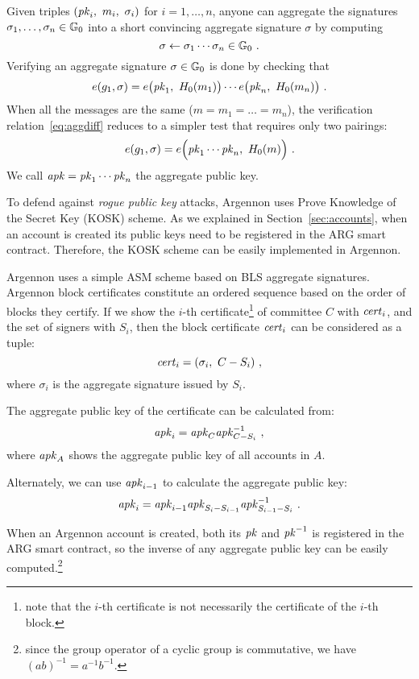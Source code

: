 Given triples $(\PK_i,\ m_i,\ \sigma_i)$ for $i=1,\ldots,n$,
anyone can aggregate the signatures $\sigma_1,\ldots,\sigma_n \in \mathbb{G}_0$
into a short convincing aggregate signature $\sigma$ by computing
\begin{equation}
    \label{eq:agg}
    \sigma \gets \sigma_1 \cdots \sigma_n \in \mathbb{G}_0\ .
\end{equation}
Verifying an aggregate signature $\sigma \in \mathbb{G}_0$ is done by checking that
\begin{equation}
    \label{eq:aggdiff}
    e(g_1, \sigma) = e\big(\PK_1,\ \Hm(m_1)\big) \cdots e\big(\PK_n,\ \Hm(m_n)\big)\ .
\end{equation}
When all the messages are the same ($m = m_1 = \ldots = m_n$), the verification relation~\eqref{eq:aggdiff} reduces to
a simpler test that requires only two pairings:
\begin{equation}
    \label{eq:aggsame}
    e(g_1, \sigma) = e\Big(\mathit{pk}_1 \cdots \mathit{pk}_n,\ H_0(m)\Big)\ .
\end{equation}
We call $\mathit{apk}=\mathit{pk}_1 \cdots \mathit{pk}_n$ the aggregate public key.

To defend against \emph{rogue public key} attacks, Argennon uses Prove Knowledge of the Secret Key (KOSK) scheme. As we
explained in Section~\ref{sec:accounts}, when an account is created its public keys need to be registered in
the ARG smart contract. Therefore, the KOSK scheme can be easily implemented in Argennon.

Argennon uses a simple ASM scheme based on BLS aggregate signatures.
Argennon block certificates constitute an ordered sequence based on the order of blocks they certify. If we show
the $i$-th certificate\footnote{note that the $i$-th certificate is not
necessarily the certificate of the $i$-th block.} of committee $C$ with $\mathit{cert}_i$, and the set of signers
with $S_i$, then the block certificate $\mathit{cert}_i$ can be considered as a tuple:
\begin{equation}
    \C_i=(\sigma_i,\ C-S_{i})\label{eq:cert}\ ,
\end{equation}
where $\sigma_i$ is the aggregate signature issued by $S_i$.

The aggregate public key of the certificate can
be calculated from:
\begin{equation}
    \APK_i=\APK_C\APK_{C-S_i}^{-1}\label{eq:aggCertPK}\ ,
\end{equation}
where $\mathit{apk}_{A}$ shows the aggregate public key of all accounts in $A$.

Alternately, we can use $\mathit{apk}_{i-1}$ to calculate the aggregate public key:
\begin{equation}
    \APK_i=\APK_{i-1}\APK_{S_i-S_{i-1}}\APK_{S_{i-1}-S_i}^{-1}\ .\label{eq:aggPK-2}
\end{equation}

When an Argennon account is created, both its $\mathit{pk}$ and $\mathit{pk}^{-1}$ is registered in the ARG smart contract, so the
inverse of any aggregate public key can be easily computed.\footnote{since the group operator of a cyclic
group is commutative, we have $(ab)^{-1}=a^{-1}b^{-1}$.}

